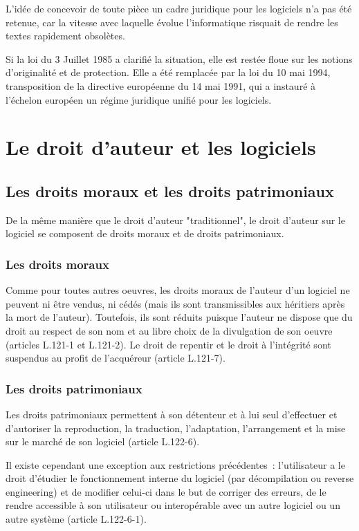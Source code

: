 \documentclass[pdftex,a4paper,11pt]{report}
\begin{document}
L'idée de concevoir de toute pièce un cadre juridique pour les logiciels n'a pas été retenue, car la vitesse avec laquelle évolue l'informatique risquait de rendre les textes rapidement obsolètes.

Si la loi du 3 Juillet 1985 a clarifié la situation, elle est restée floue sur les notions d'originalité et de protection. Elle a été remplacée par la loi du 10 mai 1994, transposition de la directive européenne du 14 mai 1991, qui a instauré à l'échelon européen un régime juridique unifié pour les logiciels.

\chapter{Le droit d'auteur et les logiciels}

\section{Les droits moraux et les droits patrimoniaux}
De la même manière que le droit d'auteur "traditionnel", le droit d'auteur sur le logiciel se composent de droits moraux et de droits patrimoniaux.

\subsection{Les droits moraux}
Comme pour toutes autres oeuvres, les droits moraux de l'auteur d'un logiciel ne peuvent ni être vendus, ni cédés (mais ils sont transmissibles aux héritiers après la mort de l'auteur). Toutefois, ils sont réduits puisque l'auteur ne dispose que du droit au respect de son nom et au libre choix de la divulgation de son oeuvre (articles L.121-1 et L.121-2). Le droit de repentir et le droit à l'intégrité sont suspendus au profit de l'acquéreur (article L.121-7).

\subsection{Les droits patrimoniaux}
Les droits patrimoniaux permettent à son détenteur et à lui seul d'effectuer et d'autoriser la reproduction, la traduction, l'adaptation, l'arrangement et la mise sur le marché de son logiciel (article L.122-6).

Il existe cependant une exception aux restrictions précédentes~: l'utilisateur a le droit d'étudier le fonctionnement interne du logiciel (par décompilation ou reverse engineering) et de modifier celui-ci dans le but de corriger des erreurs, de le rendre accessible à son utilisateur ou interopérable avec un autre logiciel ou un autre système (article L.122-6-1).
\end{document}
